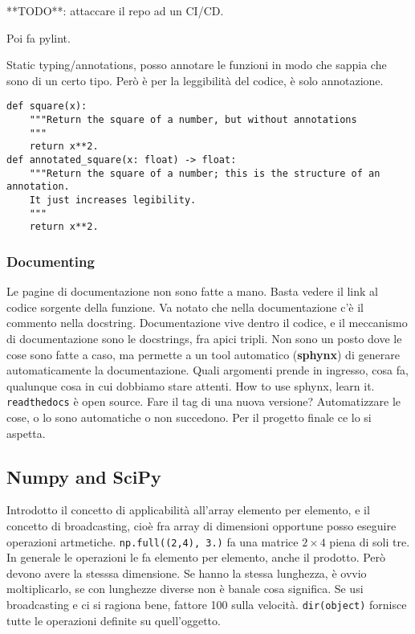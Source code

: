 \documentclass[10pt, a4paper, titlepage]{book}
\begin{document}
**TODO**: attaccare il repo ad un CI/CD.

Poi fa pylint.

Static typing/annotations, posso annotare le funzioni in modo che sappia che sono di un certo tipo. Però è per la leggibilità del codice, è solo annotazione.
\begin{verbatim}
def square(x):
	"""Return the square of a number, but without annotations
	"""
	return x**2.
def annotated_square(x: float) -> float:
	"""Return the square of a number; this is the structure of an annotation.
	It just increases legibility.
	"""
	return x**2.	
\end{verbatim}

\subsubsection{Documenting}

Le pagine di documentazione non sono fatte a mano. Basta vedere il link al codice sorgente della funzione. 
Va notato che nella documentazione c'è il commento nella docstring.
Documentazione vive dentro il codice, e il meccanismo di documentazione sono le docstrings, fra apici tripli.
Non sono un posto dove le cose sono fatte a caso, ma permette a un tool automatico (\textbf{sphynx}) di generare automaticamente la documentazione.
Quali argomenti prende in ingresso, cosa fa, qualunque cosa in cui dobbiamo stare attenti.
How to use sphynx, learn it. \texttt{readthedocs} è open source.
Fare il tag di una nuova versione?
Automatizzare le cose, o lo sono automatiche o non succedono.
Per il progetto finale ce lo si aspetta.

\subsection{Numpy and SciPy}

Introdotto il concetto di applicabilità all'array elemento per elemento, e il concetto di broadcasting, cioè fra array di dimensioni opportune posso eseguire operazioni artmetiche.
\texttt{np.full((2,4), 3.)} fa una matrice $2\times4$ piena di soli tre.
In generale le operazioni le fa elemento per elemento, anche il prodotto. Però devono avere la stesssa dimensione.
Se hanno la stessa lunghezza, è ovvio moltiplicarlo, se con lunghezze diverse non è banale cosa significa.
Se usi broadcasting e ci si ragiona bene, fattore 100 sulla velocità.
\texttt{dir(object)} fornisce tutte le operazioni definite su quell'oggetto.
\end{document}
